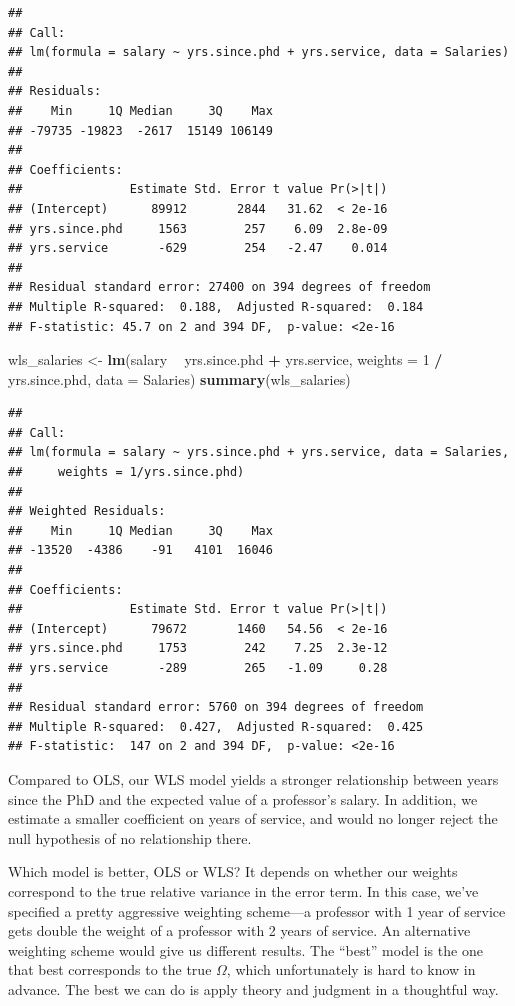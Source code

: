 \documentclass[12pt,oneside,openany]{book}
\newenvironment{Shaded}{\begin{snugshade}}{\end{snugshade}}
\newcommand{\KeywordTok}[1]{\textcolor[rgb]{0.13,0.29,0.53}{\textbf{#1}}}
\newcommand{\DataTypeTok}[1]{\textcolor[rgb]{0.13,0.29,0.53}{#1}}
\newcommand{\DecValTok}[1]{\textcolor[rgb]{0.00,0.00,0.81}{#1}}
\newcommand{\StringTok}[1]{\textcolor[rgb]{0.31,0.60,0.02}{#1}}
\newcommand{\OperatorTok}[1]{\textcolor[rgb]{0.81,0.36,0.00}{\textbf{#1}}}
\newcommand{\NormalTok}[1]{#1}
\begin{document}
\begin{verbatim}
## 
## Call:
## lm(formula = salary ~ yrs.since.phd + yrs.service, data = Salaries)
## 
## Residuals:
##    Min     1Q Median     3Q    Max 
## -79735 -19823  -2617  15149 106149 
## 
## Coefficients:
##               Estimate Std. Error t value Pr(>|t|)
## (Intercept)      89912       2844   31.62  < 2e-16
## yrs.since.phd     1563        257    6.09  2.8e-09
## yrs.service       -629        254   -2.47    0.014
## 
## Residual standard error: 27400 on 394 degrees of freedom
## Multiple R-squared:  0.188,  Adjusted R-squared:  0.184 
## F-statistic: 45.7 on 2 and 394 DF,  p-value: <2e-16
\end{verbatim}

\begin{Shaded}
\begin{Highlighting}[]
\NormalTok{wls_salaries <-}\StringTok{ }\KeywordTok{lm}\NormalTok{(salary }\OperatorTok{~}\StringTok{ }\NormalTok{yrs.since.phd }\OperatorTok{+}\StringTok{ }\NormalTok{yrs.service,}
                   \DataTypeTok{weights =} \DecValTok{1} \OperatorTok{/}\StringTok{ }\NormalTok{yrs.since.phd,}
                   \DataTypeTok{data =}\NormalTok{ Salaries)}
\KeywordTok{summary}\NormalTok{(wls_salaries)}
\end{Highlighting}
\end{Shaded}

\begin{verbatim}
## 
## Call:
## lm(formula = salary ~ yrs.since.phd + yrs.service, data = Salaries, 
##     weights = 1/yrs.since.phd)
## 
## Weighted Residuals:
##    Min     1Q Median     3Q    Max 
## -13520  -4386    -91   4101  16046 
## 
## Coefficients:
##               Estimate Std. Error t value Pr(>|t|)
## (Intercept)      79672       1460   54.56  < 2e-16
## yrs.since.phd     1753        242    7.25  2.3e-12
## yrs.service       -289        265   -1.09     0.28
## 
## Residual standard error: 5760 on 394 degrees of freedom
## Multiple R-squared:  0.427,  Adjusted R-squared:  0.425 
## F-statistic:  147 on 2 and 394 DF,  p-value: <2e-16
\end{verbatim}

Compared to OLS, our WLS model yields a stronger relationship between
years since the PhD and the expected value of a professor's salary. In
addition, we estimate a smaller coefficient on years of service, and
would no longer reject the null hypothesis of no relationship there.

Which model is better, OLS or WLS? It depends on whether our weights
correspond to the true relative variance in the error term. In this
case, we've specified a pretty aggressive weighting scheme---a professor
with 1 year of service gets double the weight of a professor with 2
years of service. An alternative weighting scheme would give us
different results. The ``best'' model is the one that best corresponds
to the true \(\Omega\), which unfortunately is hard to know in advance.
The best we can do is apply theory and judgment in a thoughtful way.
\end{document}
